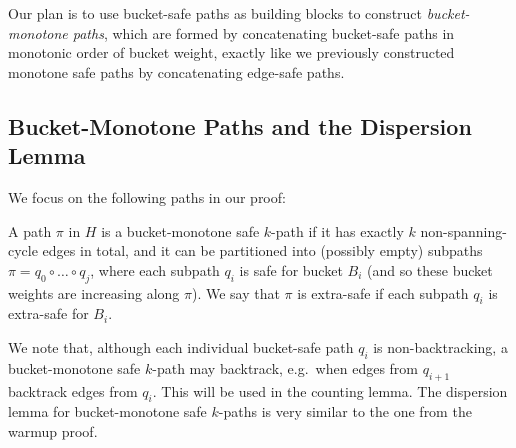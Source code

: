 \documentclass{article}\usepackage[a4paper,margin=20mm]{geometry}
\begin{document}
Our plan is to use bucket-safe paths as building blocks to construct \emph{bucket-monotone paths}, which are formed by concatenating bucket-safe paths in monotonic order of bucket weight, exactly like we previously constructed monotone safe paths by concatenating edge-safe paths.

\subsection{Bucket-Monotone Paths and the Dispersion Lemma}

We focus on the following paths in our proof:
\begin{definition} 
A path $\pi$ in $H$ is a bucket-monotone safe $k$-path if it has exactly $k$ non-spanning-cycle edges in total, and it can be partitioned into (possibly empty) subpaths $\pi = q_0 \circ \dots \circ q_j$, where each subpath $q_i$ is safe for bucket $B_i$ (and so these bucket weights are increasing along $\pi$).
We say that $\pi$ is extra-safe if each subpath $q_i$ is extra-safe for $B_i$.
\end{definition}

We note that, although each individual bucket-safe path $q_i$ is non-backtracking, a bucket-monotone safe $k$-path may backtrack, e.g.\ when edges from $q_{i+1}$ backtrack edges from $q_i$.
This will be used in the counting lemma.
The dispersion lemma for bucket-monotone safe $k$-paths is very similar to the one from the warmup proof.
\end{document}
